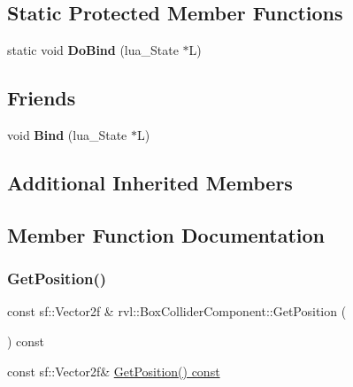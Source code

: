 \subsection*{Static Protected Member Functions}
\begin{DoxyCompactItemize}
\item 
\mbox{\label{classrvl_1_1_box_collider_component_a346ca976a43a3a24821095b3febb141e}} 
static void {\bfseries Do\+Bind} (lua\+\_\+\+State $\ast$L)
\end{DoxyCompactItemize}
\subsection*{Friends}
\begin{DoxyCompactItemize}
\item 
\mbox{\label{classrvl_1_1_box_collider_component_a4b91849455f28effbffdb471728cb026}} 
void {\bfseries Bind} (lua\+\_\+\+State $\ast$L)
\end{DoxyCompactItemize}
\subsection*{Additional Inherited Members}


\subsection{Member Function Documentation}
\mbox{\label{classrvl_1_1_box_collider_component_af3f0eb3154ab12ca6e2b99ed8a6b47b0}} 
\subsubsection{\texorpdfstring{Get\+Position()}{GetPosition()}}
{\footnotesize\ttfamily const sf\+::\+Vector2f \& rvl\+::\+Box\+Collider\+Component\+::\+Get\+Position (\begin{DoxyParamCaption}{ }\end{DoxyParamCaption}) const}



const sf\+::\+Vector2f\& \hyperlink{classrvl_1_1_box_collider_component_af3f0eb3154ab12ca6e2b99ed8a6b47b0}{Get\+Position() const} 

